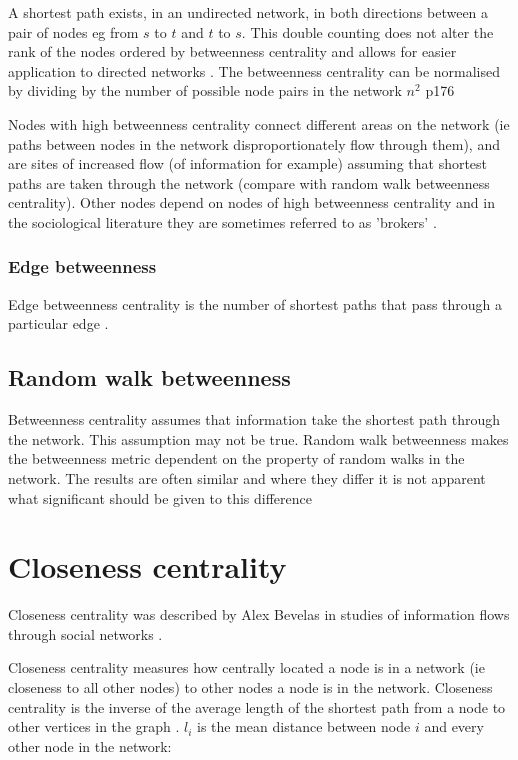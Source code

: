 A shortest path exists, in an undirected network, in both directions between a pair of nodes eg from $s$ to $t$ and $t$ to $s$. This double counting does not alter the rank of the nodes ordered by betweenness centrality and allows for easier application to directed networks \cite{newman2018networks}. The betweenness centrality can be normalised by dividing by the number of possible node pairs in the network $n^2$ \cite{newman2018networks} p176

Nodes with high betweenness centrality connect different areas on the network  (ie paths between nodes in the network disproportionately flow through them), and are sites of increased flow (of information for example) assuming that shortest paths are taken through the network \cite{borgatti2005centrality} (compare with random walk betweenness centrality). Other nodes depend on nodes of high betweenness centrality and in the sociological literature they are sometimes referred to as 'brokers' \cite{newman2018networks}. 



\subsubsection{Edge betweenness}
 Edge betweenness centrality is the number of shortest paths that pass through a particular edge \cite{girvan2002community}.

\subsection{Random walk betweenness}
\label{sec: random walk betweenness}
Betweenness centrality assumes that information take the shortest path through the network. This assumption may not be true. Random walk betweenness makes the betweenness metric dependent on the property of random walks in the network. The results are often similar and where they differ it is not apparent what significant should be given to this difference \cite{newman2018networks}

\section{Closeness centrality}
\label{sec:closenesscentrality}
Closeness centrality was described by Alex Bevelas in studies of information flows through social networks \cite{bavelas1948mathematical}. 

Closeness centrality measures how centrally located a node is in a network (ie closeness to all other nodes) to other nodes a node is in the network. Closeness centrality is the inverse of the average length of the shortest path from a node to other vertices in the graph \cite{freeman1978centrality}. $l_i$ is the mean distance between node $i$ and every other node in the network:

